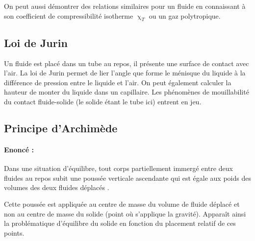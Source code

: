 On peut aussi démontrer des relations similaires pour un fluide en connaissant à son coefficient de compressibilité isotherme $\upchi_T$ ou un gaz polytropique.

\subsection{Loi de Jurin}
Un fluide est placé dans un tube au repos, il présente une surface de contact avec l'air. La loi de Jurin permet de lier l'angle que forme le ménisque du liquide à la différence de pression entre le liquide et l'air. On peut également calculer la hauteur de monter du liquide dans un capillaire. Les phénomènes de mouillabilité du contact fluide-solide (le solide étant le tube ici) entrent en jeu.

\subsection{Principe d'Archimède}
\paragraph{Enoncé :}Dans une situation d'équilibre, tout corps partiellement immergé entre deux fluides au repos subit une poussée verticale ascendante qui est égale aux poids des volumes des deux fluides déplacés \cite{amiroudine2014mecanique}.

Cette poussée est appliquée au centre de masse du volume de fluide déplacé et non au centre de masse du solide (point où s'applique la gravité). Apparaît ainsi la problématique d'équilibre du solide en fonction du placement relatif de ces points.
